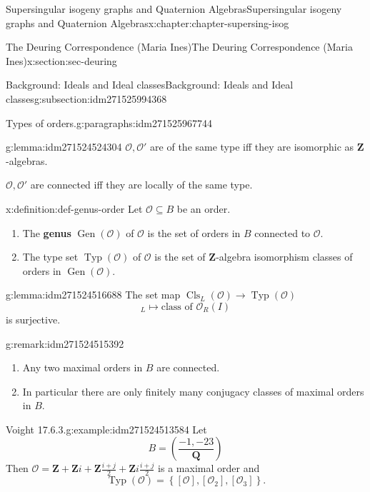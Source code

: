\documentclass[oneside,10pt,]{book}
\newcommand{\terminology}[1]{\textbf{#1}}
\numberwithin{equation}{section}
\newcommand{\legendre}[2]{\left(\frac{#1}{#2}\right)}
\newcommand{\lb}{[}
\newcommand{\rb}{]}
\newcommand{\ZZ}{\mathbf{Z}}
\newcommand{\QQ}{\mathbf{Q}}
\newcommand{\ints}{\mathcal{O}}
\begin{document}
\begin{chapterptx}{Supersingular isogeny graphs and Quaternion Algebras}{}{Supersingular isogeny graphs and Quaternion Algebras}{}{}{x:chapter:chapter-supersing-isog}
\begin{sectionptx}{The Deuring Correspondence (Maria Ines)}{}{The Deuring Correspondence (Maria Ines)}{}{}{x:section:sec-deuring}
\begin{subsectionptx}{Background: Ideals and Ideal classes}{}{Background: Ideals and Ideal classes}{}{}{g:subsection:idm271525994368}
\begin{paragraphs}{Types of orders.}{g:paragraphs:idm271525967744}
\begin{lemma}{}{}{g:lemma:idm271524524304}
\(\ints,\ints'\) are of the same type iff they are isomorphic as \(\ZZ\)-algebras.%
\par
\(\ints,\ints'\) are connected iff they are locally of the same type.%
\end{lemma}
\begin{definition}{}{x:definition:def-genus-order}%
Let \(\ints \subseteq B\) be an order.%
\begin{enumerate}
\item{}The \terminology{genus} \(\operatorname{Gen}(\ints)\) of \(\ints \) is the set of orders in \(B \) connected to \(\ints\).%
\item{}The type set \(\operatorname{Typ}(\ints)\) of \(\ints\) is the set of \(\ZZ\)-algebra isomorphism classes of orders in \(\operatorname{Gen} (\ints)\).%
\end{enumerate}
%
\end{definition}
\begin{lemma}{}{}{g:lemma:idm271524516688}%
The set map \(\operatorname{Cls}_L(\ints) \to \operatorname{Typ}(\ints)\)%
\begin{equation*}
[ I]_L \mapsto \text{class of } \ints_R(I)
\end{equation*}
is surjective.%
\end{lemma}
\begin{remark}{}{g:remark:idm271524515392}%
%
\begin{enumerate}
\item{}Any two maximal orders in \(B\) are connected.%
\item{}In particular there are only finitely many conjugacy classes of maximal orders in \(B\).%
\end{enumerate}
%
\end{remark}
\begin{example}{Voight 17.6.3.}{g:example:idm271524513584}%
Let%
\begin{equation*}
B = \legendre{-1,-23}{\QQ}
\end{equation*}
Then \(\ints=  \ZZ +  \ZZ i + \ZZ \frac{i+j}{2} + \ZZ i \frac{i+j}{2}\) is a maximal order and%
\begin{equation*}
\operatorname{Typ}(\ints) =  \left\{ \lb \ints \rb , \lb \ints_2 \rb , \lb \ints_3 \rb \right\}\text{.}
\end{equation*}
%
\end{example}
\end{paragraphs}%
\end{subsectionptx}
%
%
\typeout{************************************************}

\end{sectionptx}
\end{chapterptx}
\end{document}
